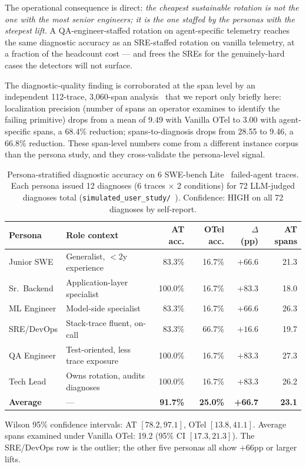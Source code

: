 \documentclass[journal]{IEEEtran}
\begin{document}
The operational consequence is direct: \emph{the cheapest sustainable rotation is not the one with the most senior engineers; it is the one staffed by the personas with the steepest lift.} A QA-engineer-staffed rotation on agent-specific telemetry reaches the same diagnostic accuracy as an SRE-staffed rotation on vanilla telemetry, at a fraction of the headcount cost --- and frees the SREs for the genuinely-hard cases the detectors will not surface.

The diagnostic-quality finding is corroborated at the span level by an independent 112-trace, 3{,}060-span analysis~\cite{aiware2026} that we report only briefly here: localization precision (number of spans an operator examines to identify the failing primitive) drops from a mean of 9.49 with Vanilla OTel to 3.00 with agent-specific spans, a 68.4\% reduction; spans-to-diagnosis drops from 28.55 to 9.46, a 66.8\% reduction. These span-level numbers come from a different instance corpus than the persona study, and they cross-validate the persona-level signal.

\begin{table}[t]
\centering
\caption{Persona-stratified diagnostic accuracy on 6 SWE-bench Lite~\cite{swebench} failed-agent traces. Each persona issued 12 diagnoses (6 traces $\times$ 2 conditions) for 72 LLM-judged diagnoses total (\texttt{simulated\_user\_study/}~\cite{atrepo}). Confidence: HIGH on all 72 diagnoses by self-report.}
\label{tab:persona}
\small
\begin{tabular}{@{}llrrrr@{}}
\toprule
\textbf{Persona} & \textbf{Role context} & \textbf{AT acc.} & \textbf{OTel acc.} & \textbf{$\Delta$ (pp)} & \textbf{AT spans} \\
\midrule
Junior SWE & Generalist, $<$2y experience & 83.3\% & 16.7\% & $+66.6$ & 21.3 \\
Sr.\ Backend & Application-layer specialist & 100.0\% & 16.7\% & $+83.3$ & 18.0 \\
ML Engineer & Model-side specialist & 83.3\% & 16.7\% & $+66.6$ & 26.3 \\
SRE/DevOps & Stack-trace fluent, on-call & 83.3\% & 66.7\% & $+16.6$ & 19.7 \\
QA Engineer & Test-oriented, less trace exposure & 100.0\% & 16.7\% & $+83.3$ & 27.3 \\
Tech Lead & Owns rotation, audits diagnoses & 100.0\% & 16.7\% & $+83.3$ & 26.2 \\
\midrule
\textbf{Average} & --- & \textbf{91.7\%} & \textbf{25.0\%} & \textbf{+66.7} & \textbf{23.1} \\
\bottomrule
\end{tabular}
\par\smallskip\noindent
\footnotesize Wilson 95\% confidence intervals: AT $[78.2, 97.1]$, OTel $[13.8, 41.1]$. Average spans examined under Vanilla OTel: 19.2 (95\% CI $[17.3, 21.3]$). The SRE/DevOps row is the outlier; the other five personas all show $+66$pp or larger lifts.
\end{table}
\end{document}
